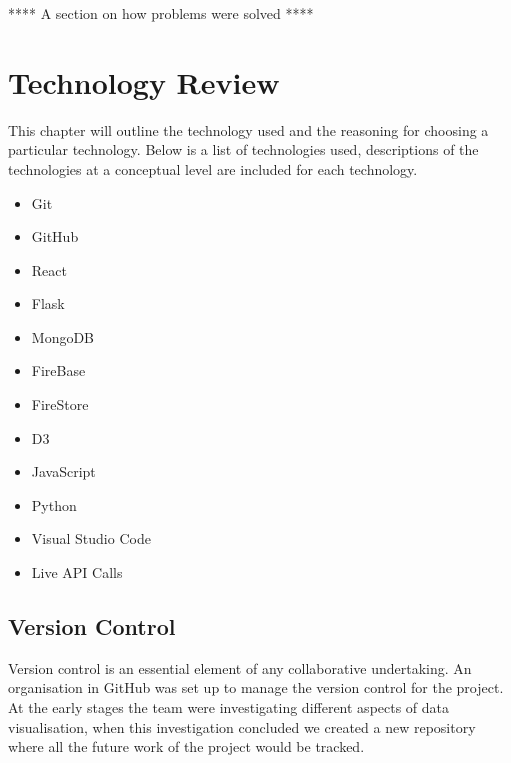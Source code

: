 **** A section on how problems were solved ****
\vspace{70mm} %


\chapter{Technology Review}
This chapter will outline the technology used and the reasoning for choosing a particular technology. Below is a list of technologies used, descriptions of the technologies at a conceptual level are included for each technology.
\begin{itemize}
\item Git
\item GitHub
\item React
\item Flask
\item MongoDB
\item FireBase
\item FireStore
\item D3
\item JavaScript
\item Python
\item Visual Studio Code
\item Live API Calls

\end{itemize}

\section{Version Control}
Version control is an essential element of any collaborative undertaking. An organisation in GitHub was set up to manage the version control for the project. At the early stages the team were investigating different aspects of data visualisation, when this investigation concluded we created a new repository where all the future work of the project would be tracked.
